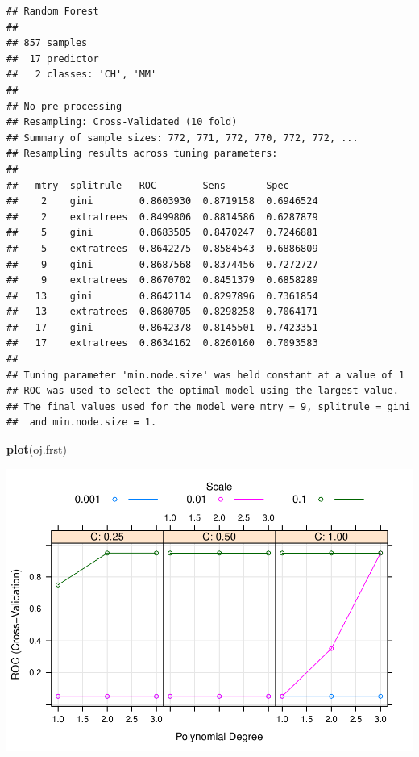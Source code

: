 \documentclass[
]{book}
\newenvironment{Shaded}{\begin{snugshade}}{\end{snugshade}}
\newcommand{\DataTypeTok}[1]{\textcolor[rgb]{0.13,0.29,0.53}{#1}}
\newcommand{\KeywordTok}[1]{\textcolor[rgb]{0.13,0.29,0.53}{\textbf{#1}}}
\newcommand{\NormalTok}[1]{#1}
\newcommand{\OperatorTok}[1]{\textcolor[rgb]{0.81,0.36,0.00}{\textbf{#1}}}
\newcommand{\StringTok}[1]{\textcolor[rgb]{0.31,0.60,0.02}{#1}}
\begin{document}
\begin{verbatim}
## Random Forest 
## 
## 857 samples
##  17 predictor
##   2 classes: 'CH', 'MM' 
## 
## No pre-processing
## Resampling: Cross-Validated (10 fold) 
## Summary of sample sizes: 772, 771, 772, 770, 772, 772, ... 
## Resampling results across tuning parameters:
## 
##   mtry  splitrule   ROC        Sens       Spec     
##    2    gini        0.8603930  0.8719158  0.6946524
##    2    extratrees  0.8499806  0.8814586  0.6287879
##    5    gini        0.8683505  0.8470247  0.7246881
##    5    extratrees  0.8642275  0.8584543  0.6886809
##    9    gini        0.8687568  0.8374456  0.7272727
##    9    extratrees  0.8670702  0.8451379  0.6858289
##   13    gini        0.8642114  0.8297896  0.7361854
##   13    extratrees  0.8680705  0.8298258  0.7064171
##   17    gini        0.8642378  0.8145501  0.7423351
##   17    extratrees  0.8634162  0.8260160  0.7093583
## 
## Tuning parameter 'min.node.size' was held constant at a value of 1
## ROC was used to select the optimal model using the largest value.
## The final values used for the model were mtry = 9, splitrule = gini
##  and min.node.size = 1.
\end{verbatim}

\begin{Shaded}
\begin{Highlighting}[]
\KeywordTok{plot}\NormalTok{(oj.frst)}
\end{Highlighting}
\end{Shaded}

\includegraphics{data-sci_files/figure-latex/unnamed-chunk-106-1.pdf}

\begin{Shaded}
\end{Shaded}
\end{document}
